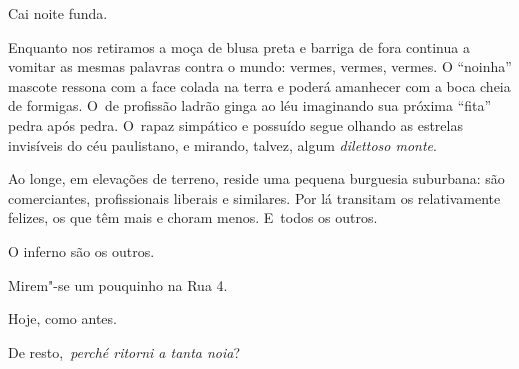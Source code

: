  

Cai noite funda.

Enquanto nos retiramos a moça de blusa preta e barriga de fora continua
a vomitar as mesmas palavras contra o mundo: vermes, vermes, vermes. O
``noinha'' mascote ressona com a face colada na terra e poderá amanhecer
com a boca cheia de formigas. O~de profissão ladrão ginga ao léu
imaginando sua próxima ``fita'' pedra após pedra. O~rapaz simpático e
possuído segue olhando as estrelas invisíveis do céu paulistano, e
mirando, talvez, algum \emph{dilettoso monte}.

Ao longe, em elevações de terreno, reside uma pequena burguesia
suburbana: são comerciantes, profissionais liberais e similares. Por lá
transitam os relativamente felizes, os que têm mais e choram menos. E~todos os outros.

O inferno são os outros.

 

Mirem"-se um pouquinho na Rua 4.

Hoje, como antes.

De resto,~\emph{perché ritorni a tanta noia}?
